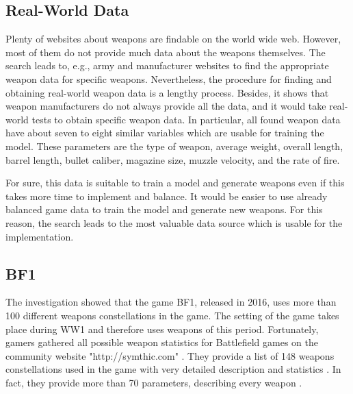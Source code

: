 \documentclass[MGS,Master,english]{twbook}%
\begin{document}
\subsection{Real-World Data}
Plenty of websites about weapons are findable on the world wide web. However, most of them do not provide much data about the weapons themselves. The search leads to, e.g., army and manufacturer websites to find the appropriate weapon data for specific weapons. Nevertheless, the procedure for finding and obtaining real-world weapon data is a lengthy process. Besides, it shows that weapon manufacturers do not always provide all the data, and it would take real-world tests to obtain specific weapon data. In particular, all found weapon data have about seven to eight similar variables which are usable for training the model. These parameters are the type of weapon, average weight, overall length, barrel length, bullet caliber, magazine size, muzzle velocity, and the rate of fire.

For sure, this data is suitable to train a model and generate weapons even if this takes more time to implement and balance. It would be easier to use already balanced game data to train the model and generate new weapons. For this reason, the search leads to the most valuable data source which is usable for the implementation.

\subsection{\acl{BF1}}\label{bf1::data}
The investigation showed that the game \ac{BF1}, released in 2016, uses more than 100 different weapons constellations in the game. The setting of the game takes place during \ac{WW1} and therefore uses weapons of this period. Fortunately, gamers gathered all possible weapon statistics for Battlefield games on the community website "http://symthic.com" \cite{symthic::bf1stats}. They provide a list of 148 weapons constellations used in the game with very detailed description and statistics \cite{symthic::bf1stats}. In fact, they provide more than 70 parameters, describing every weapon \cite{symthic::bf1stats}. 
\end{document}
